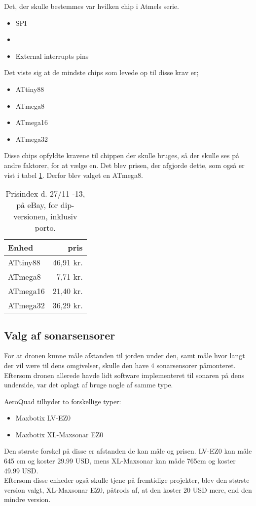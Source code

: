 \documentclass[Main]{subfiles}
\begin{document}
Det, der skulle bestemmes var hvilken chip i Atmels serie.

\vspace{-20pt}
\begin{itemize}
\item SPI
\item \itoc
\item External interrupts pins
\end{itemize}

Det viste sig at de mindste chips som levede op til disse krav er;

\vspace{-20pt}
\begin{itemize}
\item ATtiny88
\item ATmega8
\item ATmega16
\item ATmega32
\end{itemize}


Disse chips opfyldte kravene til chippen der skulle bruges, så der skulle ses på andre faktorer, for at vælge en. 
Det blev prisen, der afgjorde dette, som også er vist i tabel \ref{Tab:prisIndex}.
Derfor blev valget en ATmega8.

\begin{table}[H]
\centering
	\begin{tabular}{l r}\hline
	Enhed & pris \\ \hline
	ATtiny88 & 46,91 kr.\\
	ATmega8  & 7,71 kr.\\
	ATmega16 & 21,40 kr.\\
	ATmega32 & 36,29 kr. \\ \hline
	\end{tabular}
\caption{Prisindex d. 27/11 -13, på eBay, for dip-versionen, inklusiv porto.}
\label{Tab:prisIndex}
\end{table}



\subsection{Valg af sonarsensorer}
For at dronen kunne måle afstanden til jorden under den, samt måle hvor langt der vil være til dens omgivelser, skulle den have 4 sonarsensorer påmonteret.
Eftersom dronen allerede havde lidt software implementeret til sonaren på dens underside, var det oplagt af bruge nogle af samme type.


AeroQuad tilbyder to forskellige typer: 
\vspace{-20pt}
\begin{itemize}
\item Maxbotix LV-EZ0 \cite{LV-EZ0}
\item Maxbotix XL-Maxsonar EZ0 \cite{XL-EZ0}
\end{itemize}

Den største forskel på disse er afstanden de kan måle og prisen.
LV-EZ0 kan måle 645 cm og koster 29.99 USD, mens XL-Maxsonar kan måde 765cm og koster 49.99 USD.
\\
Eftersom disse enheder også skulle tjene på fremtidige projekter, blev den største version valgt, XL-Maxsonar EZ0, påtrods af, at den koster 20 USD mere, end den mindre version.
\end{document}
